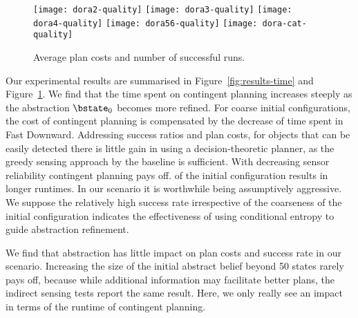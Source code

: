 \begin{figure}[h!]
  \texttt{[image: dora2-quality]}\hfill
  \texttt{[image: dora3-quality]}\hfill
  \texttt{[image: dora4-quality]}\hfill
  \vspace{2mm}
  \texttt{[image: dora56-quality]}\hfill
  \vspace{2mm}
  \texttt{[image: dora-cat-quality]}\hfill
  \caption{Average plan costs and number of successful runs.}
  \label{fig:results-quality}
\end{figure}




Our experimental results are summarised in
Figure~\ref{fig:results-time} and Figure~\ref{fig:results-quality}. We
find that the time spent on contingent planning increases steeply as
the abstraction $\bstate_0$ becomes more refined. For coarse initial
configurations, the cost of contingent planning is compensated by the
decrease of time spent in Fast Downward. Addressing success ratios and
plan costs, for objects that can be easily detected there is little
gain in using a decision-theoretic planner, as the greedy sensing
approach by the baseline is sufficient. With decreasing sensor
reliability contingent planning pays off.%
of the initial configuration results in longer runtimes. In our
scenario it is worthwhile being assumptively aggressive.  We suppose
the relatively high success rate irrespective of the coarseness of the
initial configuration indicates the effectiveness of using conditional
entropy to guide abstraction refinement.

We find that abstraction has little impact on plan
costs and success rate in our scenario. Increasing the size of the
initial abstract belief beyond 50 states rarely pays off, because
while additional information may facilitate better plans, the indirect
sensing tests report the same result. Here, we only really see an
impact in terms of the runtime of contingent planning. 


